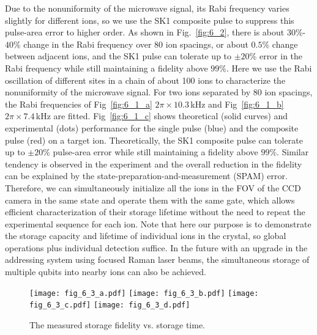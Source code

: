 Due to the nonuniformity of the microwave signal, its Rabi frequency varies slightly for different ions, so we use the SK1 composite pulse to suppress this pulse-area error to higher order. As shown in Fig.~\ref{fig:6_2}, there is about $30\%$-$40\%$ change in the Rabi frequency over 80 ion spacings, or about $0.5\%$ change between adjacent ions, and the SK1 pulse can tolerate up to $\pm20\%$ error in the Rabi frequency while still maintaining a fidelity above $99\%$. Here we use the Rabi oscillation of different sites in a chain of about 100 ions to characterize the nonuniformity of the microwave signal. For two ions separated by 80 ion spacings, the Rabi frequencies of Fig~\ref{fig:6_1_a} $2\pi\times 10.3\,$kHz and Fig~\ref{fig:6_1_b} $2\pi\times 7.4\,$kHz are fitted. Fig~\ref{fig:6_1_c} shows theoretical (solid curves) and experimental (dots) performance for the single pulse (blue) and the composite pulse (red) on a target ion. Theoretically, the SK1 composite pulse can tolerate up to $\pm 20\%$ pulse-area error while still maintaining a fidelity above $99\%$. Similar tendency is observed in the experiment and the overall reduction in the fidelity can be explained by the state-preparation-and-measurement (SPAM) error. Therefore, we can simultaneously initialize all the ions in the FOV of the CCD camera in the same state and operate them with the same gate, which allows efficient characterization of their storage lifetime without the need to repeat the experimental sequence for each ion. Note that here our purpose is to demonstrate the storage capacity and lifetime of individual ions in the crystal, so global operations plus individual detection suffice. In the future with an upgrade in the addressing system using focused Raman laser beams, the simultaneous storage of multiple qubits into nearby ions can also be achieved.

\begin{figure}
    \centering
    {\texttt{[image: fig\_6\_3\_a.pdf]}}
    {\texttt{[image: fig\_6\_3\_b.pdf]}}
    {\texttt{[image: fig\_6\_3\_c.pdf]}}
    {\texttt{[image: fig\_6\_3\_d.pdf]}}
    \caption{The measured storage fidelity vs. storage time.}
    \label{fig:6_3}
\end{figure}

